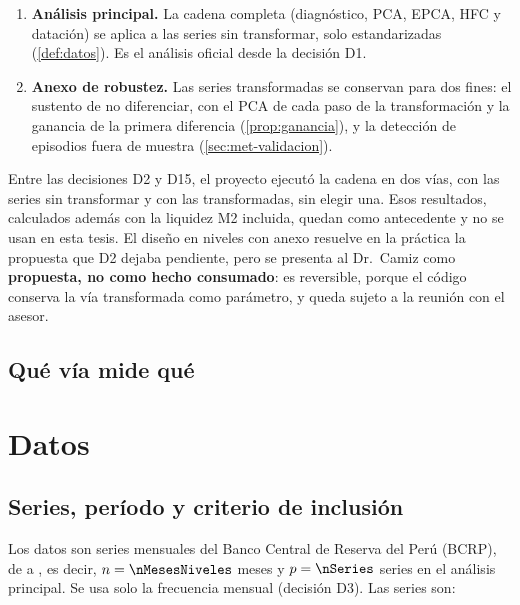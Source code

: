 \begin{enumerate}[label=(\alph*)]
  \item \textbf{Análisis principal.} La cadena completa (diagnóstico, PCA, EPCA, HFC y datación) se
    aplica a las series sin transformar, solo estandarizadas (\cref{def:datos}). Es el análisis
    oficial desde la decisión D1.
  \item \textbf{Anexo de robustez.} Las series transformadas se conservan para dos fines: el
    sustento de no diferenciar, con el PCA de cada paso de la transformación y la ganancia de la
    primera diferencia (\cref{prop:ganancia}), y la detección de episodios fuera de muestra
    (\cref{sec:met-validacion}).
\end{enumerate}

Entre las decisiones D2 y D15, el proyecto ejecutó la cadena en dos vías, con las series sin
transformar y con las transformadas, sin elegir una. Esos resultados, calculados además con la
liquidez M2 incluida, quedan como antecedente y no se usan en esta tesis. El diseño en niveles con anexo
resuelve en la práctica la propuesta que D2 dejaba pendiente, pero se presenta al Dr.~Camiz
como \textbf{propuesta, no como hecho consumado}: es reversible, porque el código conserva la
vía transformada como parámetro, y queda sujeto a la reunión con el asesor.

\subsection{Qué vía mide qué}
\label{sec:met-vias}


\section{Datos}
\label{sec:met-datos}

\subsection{Series, período y criterio de inclusión}

Los datos son \nSeries{} series mensuales del Banco Central de Reserva del Perú (BCRP), de
\fechaInicioNiveles{} a \fechaFinDatos{}, es decir, $n=\nMesesNiveles$ meses y $p=\nSeries$ series
en el análisis principal. Se usa solo la frecuencia mensual (decisión D3). Las series son:

